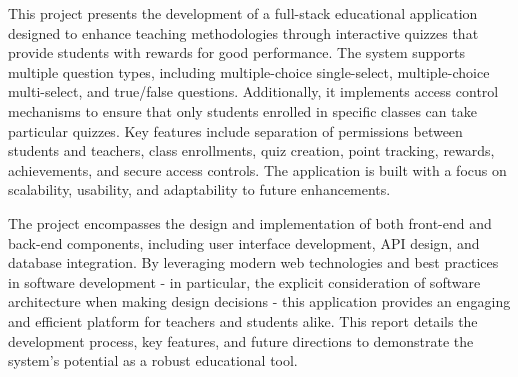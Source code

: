 This project presents the development of a full-stack educational application designed to enhance teaching methodologies through interactive quizzes that provide students with rewards for good performance. The system supports multiple question types, including multiple-choice single-select, multiple-choice multi-select, and true/false questions. Additionally, it implements access control mechanisms to ensure that only students enrolled in specific classes can take particular quizzes. Key features include separation of permissions between students and teachers, class enrollments, quiz creation, point tracking, rewards, achievements, and secure access controls. The application is built with a focus on scalability, usability, and adaptability to future enhancements. 

The project encompasses the design and implementation of both front-end and back-end components, including user interface development, API design, and database integration. By leveraging modern web technologies and best practices in software development - in particular, the explicit consideration of software architecture when making design decisions - this application provides an engaging and efficient platform for teachers and students alike. This report details the development process, key features, and future directions to demonstrate the system's potential as a robust educational tool. 